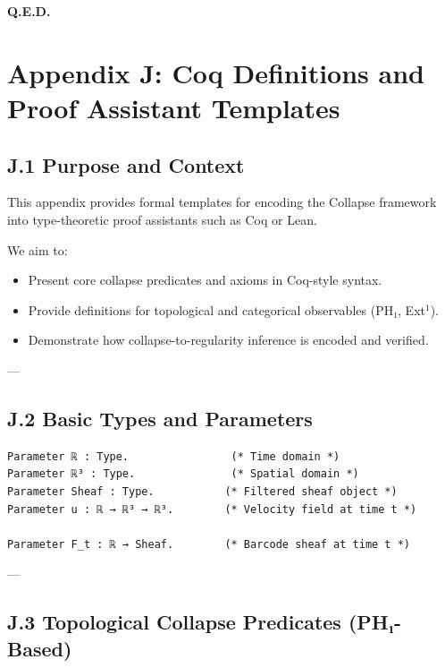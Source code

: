 \documentclass[11pt]{article}
\begin{document}
{{\begin{flushright}
\textbf{Q.E.D.}
\end{flushright}




\section*{Appendix J: Coq Definitions and Proof Assistant Templates}

\subsection*{J.1 Purpose and Context}

This appendix provides formal templates for encoding the Collapse framework  
into type-theoretic proof assistants such as Coq or Lean.

We aim to:
\begin{itemize}
  \item Present core collapse predicates and axioms in Coq-style syntax.
  \item Provide definitions for topological and categorical observables (PH₁, Ext$^1$).
  \item Demonstrate how collapse-to-regularity inference is encoded and verified.
\end{itemize}

---

\subsection*{J.2 Basic Types and Parameters}

\begin{lstlisting}[language=Coq]
Parameter ℝ : Type.                (* Time domain *)
Parameter ℝ³ : Type.               (* Spatial domain *)
Parameter Sheaf : Type.           (* Filtered sheaf object *)
Parameter u : ℝ → ℝ³ → ℝ³.        (* Velocity field at time t *)

Parameter F_t : ℝ → Sheaf.        (* Barcode sheaf at time t *)
\end{lstlisting}

---

\subsection*{J.3 Topological Collapse Predicates (PH₁-Based)}

}}
\end{document}
